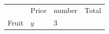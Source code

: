 {\begin{mdframed}[linewidth=4, leftmargin=40, rightmargin=40]
\begin{exercise}
\begin{enumerate}[noitemsep, label=\textbf{Step} \textbf{\arabic*}. ]
{{\begin{center}
    \noindent
    \begin{tabular}[t]{|l|l|l|l|}\hline
    
    
         &
    
    
        Price &
    
    
        number &
    
    
        Total%
     \tabularnewline\cline{1-1}\cline{2-2}\cline{3-3}\cline{4-4}
    
    
        Fruit &
    
    
        
                  \begin{math}y\end{math}
                 &
    
    
        3 &
    
    
        

\end{tabular}
\end{center}}}
\end{enumerate}
\end{exercise}
\end{mdframed}}
